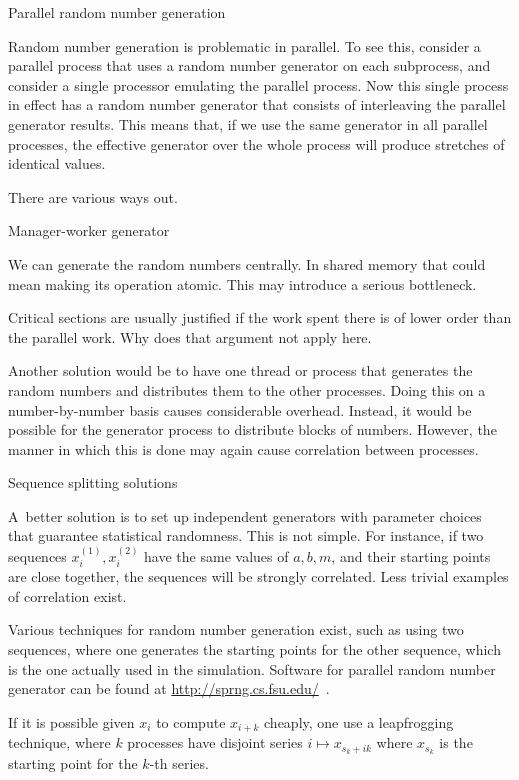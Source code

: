  {Parallel random number generation}

Random number generation is problematic in parallel. To see this,
consider a parallel process that uses a random number generator on
each subprocess, and
consider a single processor emulating the parallel process. Now this
single process in effect has a random number generator that consists
of interleaving the parallel generator results. This means that, if we
use the same generator in all parallel processes, the effective
generator over the whole process will produce stretches of identical
values.

There are various ways out.

 {Manager-worker generator}

We can generate the random numbers centrally. In shared memory that could mean
making its operation atomic. This may introduce a serious bottleneck.
\begin{exercise}
  Critical sections are usually justified if the work spent there is of lower order
  than the parallel work. Why does that argument not apply here.
\end{exercise}

Another solution would be to have one thread or process that generates
the random numbers and distributes them to the other processes.
Doing this on a number-by-number basis causes considerable overhead.
Instead, it would be possible for the generator process to distribute
blocks of numbers. However, the manner in which this is done may again
cause correlation between processes.

 {Sequence splitting solutions}

A~better solution is to set up independent generators with
parameter choices that guarantee statistical randomness. This is not
simple. For instance, if two sequences $x^{(1)}_i,x^{(2)}_i$ have the
same values of $a,b,m$, and their starting points are close together,
the sequences will be strongly correlated. Less trivial examples of
correlation exist.

Various techniques for random number generation exist, such as using
two sequences, where one generates the starting points for the other
sequence, which is the one actually used in the simulation. Software
for parallel random number generator can be found at
\url{http://sprng.cs.fsu.edu/}~\cite{Mascagni:SPRNG}.

If it is possible given $x_i$ to compute $x_{i+k}$ cheaply, one use a
leapfrogging technique, where $k$ processes have disjoint series
$i\mapsto x_{s_k+ik}$ where $x_{s_k}$ is the starting point for the
$k$-th series.

